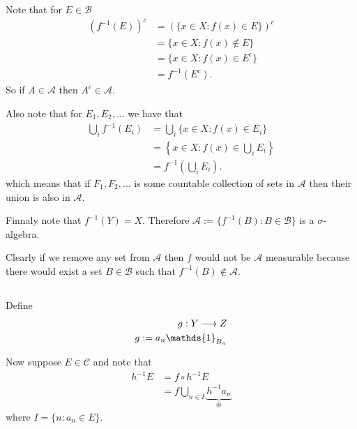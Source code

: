 \documentclass{unswmaths}
\begin{document}
\section{}
\subsection{}
Note that for $ E \in \mathcal{B} $
\begin{align*}
    \left(f^{-1}(E)\right)^c &= \left(\{ x \in X : f(x) \in E \}\right)^c \\
    &= \{ x \in X : f(x) \not\in E \} \\
    &= \{ x \in X : f(x) \in E^c \} \\
    &= f^{-1}(E^c).
\end{align*}
So if $ A \in \mathcal{A} $ then $ A^c \in \mathcal{A} $.

Also note that for $ E_1, E_2, \ldots $ 
we have that
\begin{align*}
    \bigcup_{i} f^{-1}(E_i) &= \bigcup_{i} \{ x \in X : f(x) \in E_i \} \\
        &= \left\{ x \in X : f(x) \in \bigcup_i E_i \right\} \\
        &= f^{-1}\left(\bigcup_i E_i \right).
\end{align*}
which means that if $ F_1, F_2, \ldots $ is some countable collection of sets in $ \mathcal{A} $ then their union is also in $ \mathcal{A} $.

Finnaly note that $ f^{-1}(Y) = X $. Therefore $ \mathcal{A} := \{ f^{-1}(B) : B \in \mathcal{B} \} $ is a $ \sigma$-algebra. 

Clearly if we remove any set from $ \mathcal{A} $ then $ f $ would not be $ \mathcal{A} $ measurable because there would exist a set $ B \in \mathcal{B} $ such that $ f^{-1}(B) \not\in \mathcal{A} $. 

\subsection{}
Define
\begin{align*}
    g : Y \lra Z \\
    g := a_n\mathds{1}_{B_n}
\end{align*}

Now suppose $ E \in \mathcal{C} $ and note that
\begin{align*}
    h^{-1}E &= f \circ h^{-1} E \\
        &= f \bigcup_{n \in I} \underbrace{h^{-1} a_n}_{\circledast}
\end{align*}
where $ I = \{ n : a_n \in E \}  $.
\end{document}
